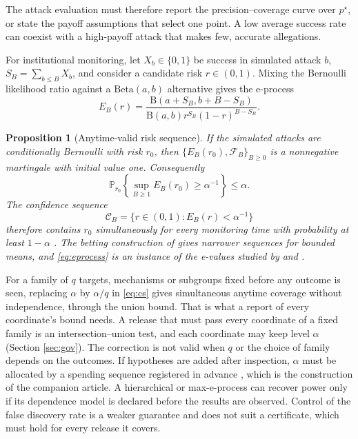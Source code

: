 \documentclass[11pt,a4paper]{article}
\theoremstyle{plain}
\newtheorem{proposition}{Proposition}
\theoremstyle{definition}
\theoremstyle{definition}
\theoremstyle{plain}
\newcommand{\Prob}{\mathbb{P}}
\begin{document}
The attack evaluation must therefore report the precision--coverage curve over
$p^\star$, or state the payoff assumptions that select one point. A low average
success rate can coexist with a high-payoff attack that makes few, accurate
allegations.

For institutional monitoring, let $X_b\in\{0,1\}$ be success in simulated attack
$b$, $S_B=\sum_{b\le B}X_b$, and consider a candidate risk $r\in(0,1)$. Mixing
the Bernoulli likelihood ratio against a $\mathrm{Beta}(a,b)$ alternative gives
the e-process
\begin{equation}
E_B(r)=
\frac{\mathrm B(a+S_B,b+B-S_B)}{\mathrm B(a,b)
r^{S_B}(1-r)^{B-S_B}}.
\label{eq:eprocess}
\end{equation}

\begin{proposition}[Anytime-valid risk sequence]\label{prop:anytime}
If the simulated attacks are conditionally Bernoulli with risk $r_0$, then
$\{E_B(r_0),\mathcal F_B\}_{B\ge0}$ is a nonnegative martingale with initial
value one. Consequently
\begin{equation}
\Prob_{r_0}\!\left\{\sup_{B\ge1}E_B(r_0)\ge\alpha^{-1}\right\}\le\alpha.
\label{eq:ville}
\end{equation}
The confidence sequence
\begin{equation}
\mathcal C_B=\{r\in(0,1):E_B(r)<\alpha^{-1}\}
\label{eq:cs}
\end{equation}
therefore contains $r_0$ simultaneously for every monitoring time with
probability at least $1-\alpha$ \citep{ville1939,howard2020,howard2021}. The
betting construction of \citet{waudbysmith2024} gives narrower sequences for
bounded means, and \eqref{eq:eprocess} is an instance of the e-values studied
by \citet{vovk2021} and \citet{grunwald2024}.
\end{proposition}

For a family of $q$ targets, mechanisms or subgroups fixed before any outcome
is seen, replacing $\alpha$ by $\alpha/q$ in \eqref{eq:cs} gives simultaneous
anytime coverage without independence, through the union bound. That is what a
report of every coordinate's bound needs. A release that must pass every
coordinate of a fixed family is an intersection--union test, and each coordinate
may keep level $\alpha$ (Section \ref{sec:gov}). The correction is not
valid when $q$ or the choice of family depends on the outcomes. If hypotheses
are added after inspection, $\alpha$ must be allocated by a spending sequence
registered in advance \citep{foster2008,tian2021}, which is the construction of the
companion article. A hierarchical or max-e-process can recover power only if its
dependence model is declared before the results are observed. Control of the
false discovery rate \citep{benjamini1995} is a weaker guarantee and does not
suit a certificate, which must hold for every release it covers.
\end{document}
